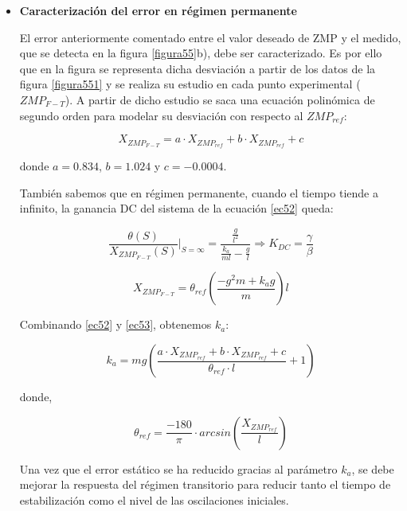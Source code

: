 \begin{itemize}

\item \textbf{Caracterización del error en régimen permanente}

El error anteriormente comentado entre el valor deseado de ZMP y el medido, que se detecta en la figura \ref{figura55}b), debe ser caracterizado. Es por ello que en la figura %
se representa dicha desviación a partir de los datos de la figura \ref{figura551} y se realiza su estudio en cada punto experimental ($ZMP_{F-T}$). A partir de dicho estudio se saca una ecuación polinómica de segundo orden para modelar su desviación con respecto al $ZMP_{ref}$:

\begin{equation}
X_{ZMP_{F-T}} = a \cdot X_{ZMP_{ref}} + b \cdot X_{ZMP_{ref}} + c
\label{ec53}
\end{equation}

donde $a=0.834$, $b=1.024$ y $c=-0.0004$.

También sabemos que en régimen permanente, cuando el tiempo tiende a infinito, la ganancia DC del sistema de la ecuación \ref{ec52} queda:

\begin{equation}
\frac{\theta(S)}{X_{ZMP_{F-T}}(S)}|_{S=\infty}=\frac{\frac{g}{l^2}}{\frac{k_a}{ml} - \frac{g}{l}}\Rightarrow K_{DC}=\frac{\gamma}{\beta}
\label{ec54}
\end{equation}

\begin{equation}
X_{ZMP_{F-T}}=\theta_{ref}(\frac{-g^{2}m+k_{a}g}{m})l
\label{ec55}
\end{equation}

Combinando \ref{ec52} y \ref{ec53}, obtenemos $k_a$:

\begin{equation}
k_a=mg(\frac{a \cdot X_{ZMP_{ref}} + b \cdot X_{ZMP_{ref}} + c}{\theta_{ref}\cdot l}+1)
\label{ec56}
\end{equation}

donde,

\begin{equation}
\theta_{ref}=\frac{-180}{\pi}\cdot arcsin(\frac{X_{ZMP_{ref}}}{l})
\label{ec57}
\end{equation}

Una vez que el error estático se ha reducido gracias al parámetro $k_a$, se debe mejorar la respuesta del régimen transitorio para reducir tanto el tiempo de estabilización como el nivel de las oscilaciones iniciales.


\end{itemize}
